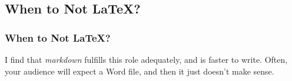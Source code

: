 {\subsection{When to Not \LaTeX?}
\begin{frame}[fragile]
  \frametitle{When to Not \LaTeX?}
  \vspace{3mm}
  \begin{itemize}
     I find that \textsl{markdown} fulfills this role adequately, and is faster to write.
     Often, your audience will expect a Word file, and then it just doesn't make sense.
  \end{itemize}
\end{frame}

}


